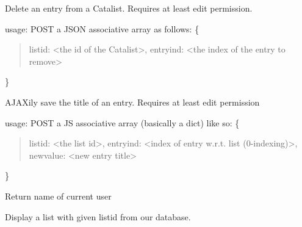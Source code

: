 \documentclass[letterpaper,10pt,english]{sphinxmanual}
\begin{document}

\begin{fulllineitems}
\label{index:routes.entry_delete}
Delete an entry from a Catalist. Requires at least edit permission.

usage: POST a JSON associative array as follows:
\{
\begin{quote}

listid: \textless{}the id of the Catalist\textgreater{},
entryind: \textless{}the index of the entry to remove\textgreater{}
\end{quote}

\}

\end{fulllineitems}


\begin{fulllineitems}
\label{index:routes.entry_title_save}
AJAXily save the title of an entry. Requires at least edit permission

usage: POST a JS associative array (basically a dict) like so:
\{
\begin{quote}

listid:  \textless{}the list id\textgreater{},
entryind: \textless{}index of entry w.r.t. list (0-indexing)\textgreater{},
newvalue: \textless{}new entry title\textgreater{}
\end{quote}

\}

\end{fulllineitems}


\begin{fulllineitems}
\label{index:routes.get_id}
Return name of current user

\end{fulllineitems}


\begin{fulllineitems}
\label{index:routes.getlist}
Display a list with given listid from our database.

\end{fulllineitems}
\end{document}
